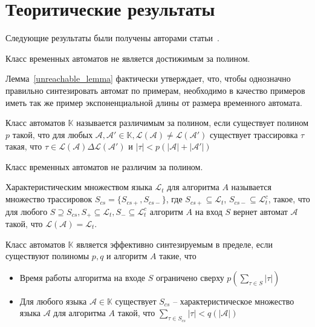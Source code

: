 \documentclass[times,specification,annotation]{itmo-student-thesis}
\begin{document}
\section{Теоритические результаты}
Следующие результаты были получены авторами статьи~\cite{1-dta}.

\begin{lemma}
  Класс временных автоматов не является достижимым за полином.
  \label{unreachable_lemma}
\end{lemma}

Лемма~\ref{unreachable_lemma} фактически утверждает, что, чтобы однозначно правильно синтезировать 
автомат по примерам, необходимо в качество примеров иметь так же пример экспоненциальной длины от размера временного автомата.

\begin{definition}
  Класс автоматов $\mathbb{K}$ называется различимым за полином, если существует полином $p$ такой, что для любых
  $\mathcal{A}, \mathcal{A'} \in \mathbb{K}, \mathcal{L}(\mathcal{A}) \neq \mathcal{L}(\mathcal{A'})$ существует трассировка $\tau$ такая, что 
  $\tau \in \mathcal{L}(\mathcal{A}) \Delta \mathcal{L}(\mathcal{A'})$ и $|\tau| < p(|\mathcal{A}| + |\mathcal{A'}|)$
\end{definition}

\begin{lemma}
  Класс временных автоматов не различим за полином.
  \label{distinguishability_lemma}
\end{lemma}

\begin{definition}
    Характеристическим множеством языка $\mathcal{L}_t$ для алгоритма $A$ называется множество трассировок $S_{cs} = \{S_{cs+}, S_{cs-}\}$, где
  $S_{cs+} \subseteq \mathcal{L}_t$, $S_{cs-} \subseteq \mathcal{L}_t^c$, такое, что 
  для любого $S \supseteq S_{cs}, S_+ \subseteq \mathcal{L}_t, S_- \subseteq \mathcal{L}_t^c$ алгоритм $A$ на вход $S$ вернет автомат $\mathcal{A}$ такой, что $\mathcal{L}(\mathcal{A}) = \mathcal{L}_t$.
\end{definition}

\begin{definition}
    Класс автоматов $\mathbb{K}$ является эффективно синтезируемым в пределе, если существуют полиномы $p, q$ и алгоритм $A$ такие, что
  \begin{itemize}
    \item Время работы алгоритма на входе $S$ ограничено сверху $p(\mathop{\sum}\limits_{\tau \in S}|\tau|)$
    \item Для любого языка $\mathcal{A} \in \mathbb{K}$ существует $S_{cs} $ 
      -- характеристическое множество языка $\mathcal{A}$ для алгоритма $A$ такой, что $\mathop{\sum}\limits_{\tau \in S_{cs}}|\tau| < q(|\mathcal{A}|)$
  \end{itemize}
\end{definition}
\end{document}
